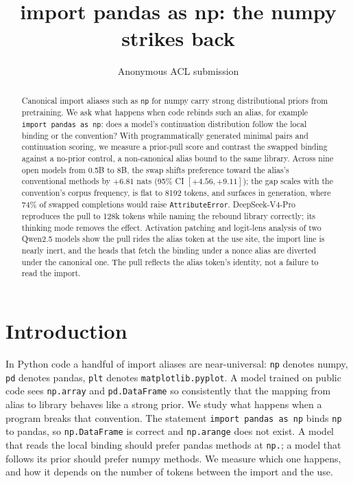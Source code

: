 \documentclass[11pt]{article}
\title{import pandas as np: the numpy strikes back}
\author{Anonymous ACL submission}
\begin{document}
\maketitle

\begin{abstract}
Canonical import aliases such as \texttt{np} for numpy carry strong distributional priors from pretraining. We ask what happens when code rebinds such an alias, for example \texttt{import pandas as np}: does a model's continuation distribution follow the local binding or the convention? With programmatically generated minimal pairs and continuation scoring, we measure a prior-pull score and contrast the swapped binding against a no-prior control, a non-canonical alias bound to the same library. Across nine open models from 0.5B to 8B, the swap shifts preference toward the alias's conventional methods by $+6.81$ nats (95\% CI $[+4.56, +9.11]$); the gap scales with the convention's corpus frequency, is flat to 8192 tokens, and surfaces in generation, where 74\% of swapped completions would raise \texttt{AttributeError}. DeepSeek-V4-Pro reproduces the pull to 128k tokens while naming the rebound library correctly; its thinking mode removes the effect. Activation patching and logit-lens analysis of two Qwen2.5 models show the pull rides the alias token at the use site, the import line is nearly inert, and the heads that fetch the binding under a nonce alias are diverted under the canonical one. The pull reflects the alias token's identity, not a failure to read the import.
\end{abstract}

\section{Introduction}

In Python code a handful of import aliases are near-universal: \texttt{np} denotes numpy, \texttt{pd} denotes pandas, \texttt{plt} denotes \texttt{matplotlib.pyplot}. A model trained on public code sees \texttt{np.array} and \texttt{pd.DataFrame} so consistently that the mapping from alias to library behaves like a strong prior. We study what happens when a program breaks that convention. The statement \texttt{import pandas as np} binds \texttt{np} to pandas, so \texttt{np.DataFrame} is correct and \texttt{np.arange} does not exist. A model that reads the local binding should prefer pandas methods at \texttt{np.}; a model that follows its prior should prefer numpy methods. We measure which one happens, and how it depends on the number of tokens between the import and the use.
\end{document}
